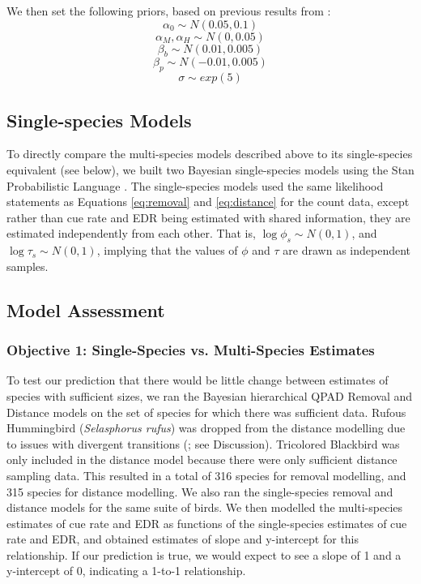\documentclass[12pt]{article}
\begin{document}
We then set the following priors, based on previous results from \citet{solymos_phylogeny_2018}:
$$\alpha_0 \sim N(0.05, 0.1)$$
$$ \alpha_M, \alpha_H \sim N(0, 0.05)$$
$$ \beta_b \sim N(0.01, 0.005)$$
$$ \beta_p \sim N(-0.01, 0.005) $$
$$\sigma \sim exp(5)$$

\subsection{Single-species Models}

\par To directly compare the multi-species models described above to its single-species equivalent (see below), we built two Bayesian single-species models using the Stan Probabilistic Language \citep{stan_development_team_stan_2024}.
The single-species models used the same likelihood statements as Equations \ref{eq:removal} and \ref{eq:distance} for the count data, except rather than cue rate and EDR being estimated with shared information, they are estimated independently from each other.
That is, $\log \phi_s \sim N(0,1)$, and $\log \tau_s \sim N(0,1)$, implying that the values of $\phi$ and $\tau$ are drawn as independent samples.


\subsection{Model Assessment}
\subsubsection{Objective 1: Single-Species vs. Multi-Species Estimates}
\par To test our prediction that there would be little change between estimates of species with sufficient sizes, we ran the Bayesian hierarchical QPAD Removal and Distance models on the set of species for which there was sufficient data.
Rufous Hummingbird (\textit{Selasphorus rufus}) was dropped from the distance modelling due to issues with divergent transitions (\citet{betancourt_diagnosing_2016, leimkuhler_simulating_2005}; see Discussion).
Tricolored Blackbird was only included in the distance model because there were only sufficient distance sampling data.
This resulted in a total of 316 species for removal modelling, and 315 species for distance modelling.
We also ran the single-species removal and distance models for the same suite of birds.
We then modelled the multi-species estimates of cue rate and EDR as functions of the single-species estimates of cue rate and EDR, and obtained estimates of slope and y-intercept for this relationship.
If our prediction is true, we would expect to see a slope of 1 and a y-intercept of 0, indicating a 1-to-1 relationship.
\end{document}

